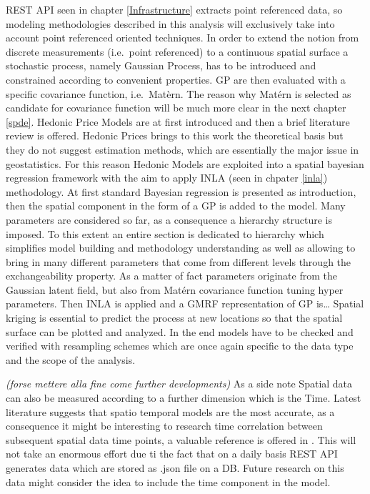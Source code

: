 \documentclass[
  12pt,
  a4paper,
  oneside]{book}
\theoremstyle{definition}
\theoremstyle{definition}
\theoremstyle{definition}
\theoremstyle{remark}
\begin{document}
REST API seen in chapter \ref{Infrastructure} extracts point referenced data, so modeling methodologies described in this analysis will exclusively take into account point referenced oriented techniques.
In order to extend the notion from discrete measurements (i.e.~point referenced) to a continuous spatial surface a stochastic process, namely Gaussian Process, has to be introduced and constrained according to convenient properties. GP are then evaluated with a specific covariance function, i.e.~Matèrn. The reason why Matérn is selected as candidate for covariance function will be much more clear in the next chapter \ref{spde}.
Hedonic Price Models are at first introduced and then a brief literature review is offered. Hedonic Prices brings to this work the theoretical basis but they do not suggest estimation methods, which are essentially the major issue in geostatistics. For this reason Hedonic Models are exploited into a spatial bayesian regression framework with the aim to apply INLA (seen in chpater \ref{inla}) methodology.
At first standard Bayesian regression is presented as introduction, then the spatial component in the form of a GP is added to the model. Many parameters are considered so far, as a consequence a hierarchy structure is imposed. To this extent an entire section is dedicated to hierarchy which simplifies model building and methodology understanding as well as allowing to bring in many different parameters that come from different levels through the exchangeability property.
As a matter of fact parameters originate from the Gaussian latent field, but also from Matérn covariance function tuning hyper parameters.
Then INLA is applied and a GMRF representation of GP is\ldots{}
Spatial kriging is essential to predict the process at new locations so that the spatial surface can be plotted and analyzed.
In the end models have to be checked and verified with resampling schemes which are once again specific to the data type and the scope of the analysis.

\emph{(forse mettere alla fine come further developments)}
As a side note Spatial data can also be measured according to a further dimension which is the Time. Latest literature suggests that spatio temporal models are the most accurate, as a consequence it might be interesting to research time correlation between subsequent spatial data time points, a valuable reference is offered in \citet{PACI2017149}. This will not take an enormous effort due ti the fact that on a daily basis REST API generates data which are stored as .json file on a DB. Future research on this data might consider the idea to include the time component in the model.
\end{document}
